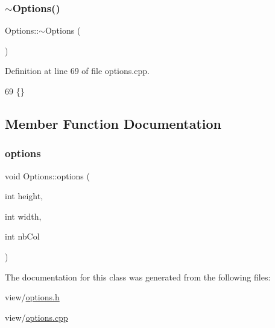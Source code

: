 \subsubsection{\texorpdfstring{$\sim$\+Options()}{~Options()}}
{\footnotesize\ttfamily Options\+::$\sim$\+Options (\begin{DoxyParamCaption}{ }\end{DoxyParamCaption})}



Definition at line 69 of file options.\+cpp.


\begin{DoxyCode}
69 \{\}
\end{DoxyCode}


\subsection{Member Function Documentation}
\hypertarget{class_options_aebc534fbc72d1be99b44fdd691d10ebc}{}\label{class_options_aebc534fbc72d1be99b44fdd691d10ebc} 
\subsubsection{\texorpdfstring{options}{options}}
{\footnotesize\ttfamily void Options\+::options (\begin{DoxyParamCaption}\item[{int}]{height,  }\item[{int}]{width,  }\item[{int}]{nb\+Col }\end{DoxyParamCaption})\hspace{0.3cm}{\ttfamily [signal]}}



The documentation for this class was generated from the following files\+:\begin{DoxyCompactItemize}
\item 
view/\hyperlink{options_8h}{options.\+h}\item 
view/\hyperlink{options_8cpp}{options.\+cpp}\end{DoxyCompactItemize}
